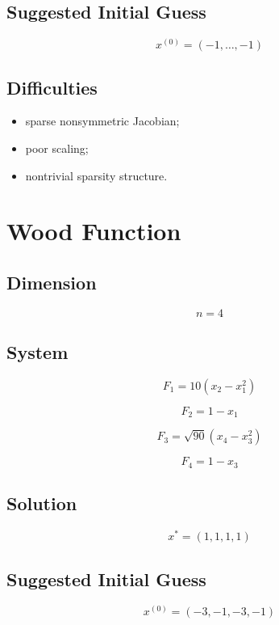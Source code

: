 \documentclass[11pt,a4paper]{article}
\begin{document}
\subsection*{Suggested Initial Guess}

\[
x^{(0)}=(-1,\dots,-1)
\]

\subsection*{Difficulties}

\begin{itemize}
  \item sparse nonsymmetric Jacobian;
  \item poor scaling;
  \item nontrivial sparsity structure.
\end{itemize}

\section{Wood Function}

\subsection*{Dimension}

\[
n=4
\]

\subsection*{System}

\[
F_1=10(x_2-x_1^2)
\]

\[
F_2=1-x_1
\]

\[
F_3=\sqrt{90}(x_4-x_3^2)
\]

\[
F_4=1-x_3
\]

\subsection*{Solution}

\[
x^*=(1,1,1,1)
\]

\subsection*{Suggested Initial Guess}

\[
x^{(0)}=(-3,-1,-3,-1)
\]
\end{document}
